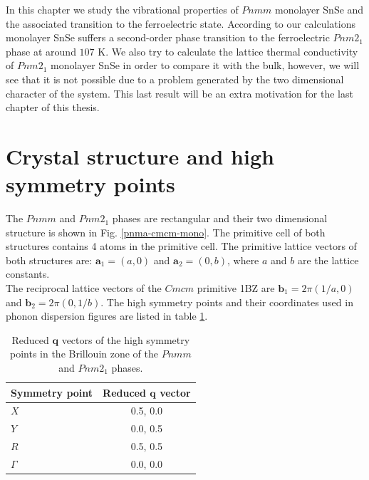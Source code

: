 In this chapter we study the vibrational properties of $Pnmm$ monolayer SnSe and the associated transition to the 
ferroelectric state. According to our calculations monolayer SnSe suffers a second-order phase transition to the 
ferroelectric $Pnm2_{1}$ phase at around $107$ K. We also try to calculate the lattice thermal conductivity of 
$Pnm2_{1}$ monolayer SnSe in order to compare it with the bulk, however, we will see that it is not possible due to 
a problem generated by the two dimensional character of the system. This last result will be an extra motivation for 
the last chapter of this thesis.

\section{Crystal structure and high symmetry points}

The $Pnmm$ and $Pnm2_{1}$ phases are rectangular and their two dimensional structure is shown in 
Fig. \ref{pnma-cmcm-mono}. The primitive cell of both structures contains 4 atoms in the primitive cell. The 
primitive lattice vectors of both structures are: $\mathbf{a}_{1}=(a,0)$ and $\mathbf{a}_{2}=(0,b)$, where $a$ and 
$b$ are the lattice constants. \\

The reciprocal lattice vectors of the $Cmcm$ primitive 1BZ are $\mathbf{b}_{1}=2\pi(1/a,0)$ and 
$\mathbf{b}_{2}=2\pi(0,1/b)$. The high symmetry points and their coordinates used in phonon dispersion figures are 
listed in table \ref{qpoints-mono}.
\begin{table}
\begin{center}
\begin{tabular*}{0.45\textwidth}{l c}
 \hline
 \hline
             Symmetry point  & Reduced $\mathbf{q}$ vector  \\
 \hline
 $X$                  &  0.5, 0.0 \\
 $Y$                  &  0.0, 0.5 \\
 $R$                  &  0.5, 0.5  \\
 $\Gamma$             &  0.0, 0.0  \\
 \hline
 \hline
\end{tabular*}
\end{center}
\caption{Reduced $\mathbf{q}$ vectors of the high symmetry points in the Brillouin zone of the $Pnmm$ and $Pnm2_{1}$ 
phases.}
\label{qpoints-mono}
\end{table}

